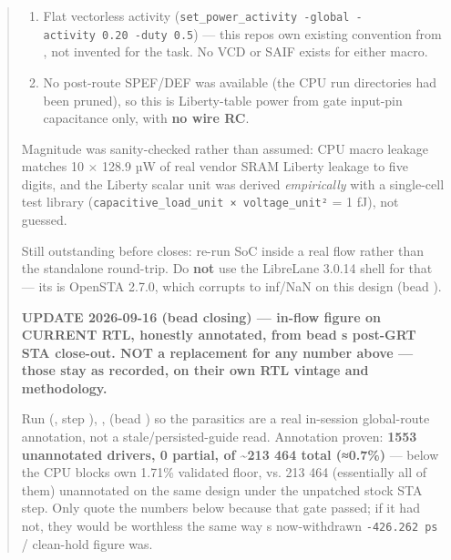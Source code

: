 \begin{record}
\begin{quote}
\begin{enumerate}
\def\labelenumi{\arabic{enumi}.}
\tightlist
\item
  Flat vectorless activity
  (\texttt{set\_\allowbreak{}power\_\allowbreak{}activity\ -\allowbreak{}global\ -\allowbreak{}activity\ 0.\allowbreak{}20\ -\allowbreak{}duty\ 0.\allowbreak{}5})
  --- this repo\textquotesingle s own existing convention from
  , not invented for the task. No VCD or
  SAIF exists for either macro.
\item
  No post-route SPEF/DEF was available (the CPU run directories had been
  pruned), so this is Liberty-table power from gate input-pin
  capacitance only, with \textbf{no wire RC}.
\end{enumerate}

Magnitude was sanity-checked rather than assumed: CPU macro leakage
matches 10 × 128.9 µW of real vendor SRAM Liberty leakage to five
digits, and the Liberty  scalar unit was derived
\emph{empirically} with a single-cell test library
(\texttt{capacitive\_\allowbreak{}load\_\allowbreak{}unit\ ×\ voltage\_\allowbreak{}unit²}
= 1 fJ), not guessed.

Still outstanding before  closes: re-run SoC
 inside a real flow rather than the standalone
round-trip. Do \textbf{not} use the LibreLane 3.0.14 shell for that ---
its  is OpenSTA 2.7.0, which corrupts  to
inf/NaN on this design (bead ).

\textbf{UPDATE 2026-09-16 (bead  closing) --- in-flow figure
on CURRENT RTL, honestly annotated, from bead
\textquotesingle s post-GRT STA close-out. NOT a replacement
for any number above --- those stay as recorded, on their own RTL
vintage and methodology.}

Run  (, step
),
,
 (bead ) so the
parasitics are a real in-session global-route annotation, not a
stale/\allowbreak{}persisted-guide read. Annotation proven: \textbf{1553
unannotated drivers, 0 partial, of \textasciitilde213 464 total
(≈0.7\%)} --- below the CPU block\textquotesingle s own 1.71\% validated
floor, vs. 213 464 (essentially all of them) unannotated on the same
design under the unpatched stock STA step. Only quote the numbers below
because that gate passed; if it had not, they would be worthless the
same way \textquotesingle s now-withdrawn
\texttt{-\allowbreak{}426.\allowbreak{}262\ ps} / clean-hold figure was.


\end{quote}
\end{record}
